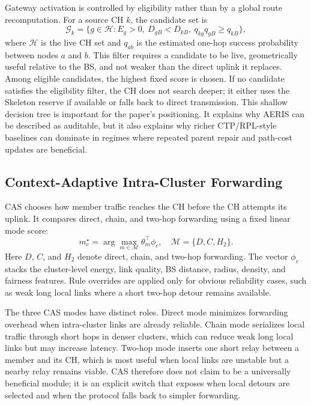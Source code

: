 \documentclass[conference]{IEEEtran}
\begin{document}
Gateway activation is controlled by eligibility rather than by a global route recomputation. For a source CH $k$, the candidate set is
\begin{equation}
\mathcal{G}_k=\{g\in\mathcal{H}:E_g>0,\ D_{gB}<D_{kB},\ q_{kg}q_{gB}\ge q_{kB}\},
\end{equation}
where $\mathcal{H}$ is the live CH set and $q_{ab}$ is the estimated one-hop success probability between nodes $a$ and $b$. This filter requires a candidate to be live, geometrically useful relative to the BS, and not weaker than the direct uplink it replaces. Among eligible candidates, the highest fixed score is chosen. If no candidate satisfies the eligibility filter, the CH does not search deeper; it either uses the Skeleton reserve if available or falls back to direct transmission. This shallow decision tree is important for the paper's positioning. It explains why AERIS can be described as auditable, but it also explains why richer CTP/RPL-style baselines can dominate in regimes where repeated parent repair and path-cost updates are beneficial.

\subsection{Context-Adaptive Intra-Cluster Forwarding}
CAS chooses how member traffic reaches the CH before the CH attempts its uplink. It compares direct, chain, and two-hop forwarding using a fixed linear mode score:
\begin{equation}
m_c^{\star}=\arg\max_{m\in\mathcal{M}}\theta_m^\top\phi_c,\quad \mathcal{M}=\{D,C,H_2\}.
\end{equation}
Here $D$, $C$, and $H_2$ denote direct, chain, and two-hop forwarding. The vector $\phi_c$ stacks the cluster-level energy, link quality, BS distance, radius, density, and fairness features. Rule overrides are applied only for obvious reliability cases, such as weak long local links where a short two-hop detour remains available.

The three CAS modes have distinct roles. Direct mode minimizes forwarding overhead when intra-cluster links are already reliable. Chain mode serializes local traffic through short hops in denser clusters, which can reduce weak long local links but may increase latency. Two-hop mode inserts one short relay between a member and its CH, which is most useful when local links are unstable but a nearby relay remains viable. CAS therefore does not claim to be a universally beneficial module; it is an explicit switch that exposes when local detours are selected and when the protocol falls back to simpler forwarding.
\end{document}
